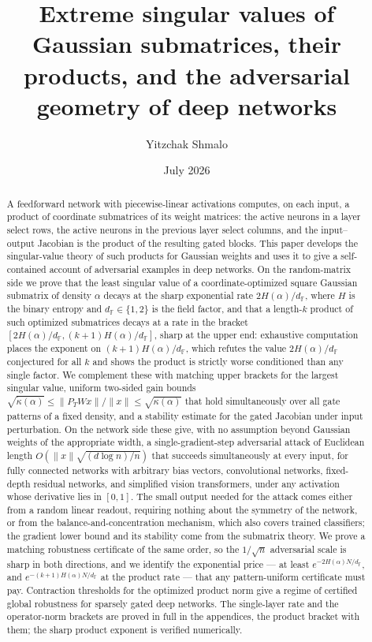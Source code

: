 \documentclass[11pt,reqno]{amsart}
\title[Submatrix singular values and adversarial geometry of deep networks]{Extreme singular values of Gaussian submatrices, their products, and the adversarial geometry of deep networks}
\author{Yitzchak Shmalo}
\date{July 2026}
\theoremstyle{plain}
\theoremstyle{definition}
\theoremstyle{remark}
\newcommand{\F}{\mathbb{F}}
\newcommand{\dF}{d_{\F}}
\newcommand{\kcheck}{\check{\kappa}}
\begin{document}
\begin{abstract}
A feedforward network with piecewise-linear activations computes, on each input, a product of
coordinate submatrices of its weight matrices: the active neurons in a layer select rows, the
active neurons in the previous layer select columns, and the input--output Jacobian is the product
of the resulting gated blocks. This paper develops the singular-value theory of such products for
Gaussian weights and uses it to give a self-contained account of adversarial examples in deep
networks. On the random-matrix side we prove that the least singular value of a coordinate-optimized square
Gaussian submatrix of density $\alpha$ decays at the sharp exponential rate $2H(\alpha)/\dF$, where
$H$ is the binary entropy and $\dF\in\{1,2\}$ is the field factor, and that a length-$k$ product of
such optimized submatrices decays at a rate in the bracket $[2H(\alpha)/\dF,(k+1)H(\alpha)/\dF]$,
sharp at the upper end: exhaustive computation places the exponent on $(k+1)H(\alpha)/\dF$, which
refutes the value $2H(\alpha)/\dF$ conjectured for all $k$ and shows the product is strictly worse
conditioned than any single factor. We complement these with matching upper
brackets for the largest singular value, uniform two-sided gain bounds
$\sqrt{\kcheck(\alpha)}\le\|P_TWx\|/\|x\|\le\sqrt{\kappa(\alpha)}$ that hold simultaneously over all
gate patterns of a fixed density, and a stability estimate for the gated Jacobian under input
perturbation. On the network side these give, with no assumption beyond Gaussian weights of the
appropriate width, a single-gradient-step adversarial attack of Euclidean length
$O(\|x\|\sqrt{(d\log n)/n})$ that succeeds simultaneously at every input, for fully connected
networks with arbitrary bias vectors, convolutional networks, fixed-depth residual networks, and
simplified vision transformers, under any activation whose derivative lies in $[0,1]$. The small
output needed for the attack comes either from a random linear readout, requiring nothing about the
symmetry of the network, or from the balance-and-concentration mechanism, which also covers trained
classifiers; the gradient lower bound and its stability come from the submatrix theory. We prove a
matching robustness certificate of the same order, so the $1/\sqrt{n}$ adversarial scale is sharp
in both directions, and we identify the exponential price --- at least $e^{-2H(\alpha)N/\dF}$, and
$e^{-(k+1)H(\alpha)N/\dF}$ at the product rate --- that any pattern-uniform certificate must pay.
Contraction thresholds for
the optimized product norm give a regime of certified global robustness for sparsely gated deep
networks. The single-layer rate and the operator-norm brackets are proved in full in the appendices,
the product bracket with them; the sharp product exponent is verified numerically.
\end{abstract}
\maketitle
\end{document}
